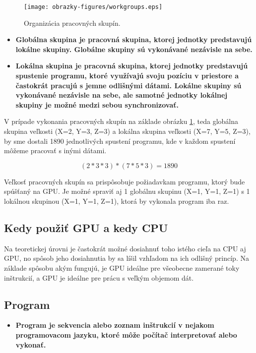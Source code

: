 \begin{figure}[H]
	\centering
	\texttt{[image: obrazky-figures/workgroups.eps]}
	\caption{Organizácia pracovných skupín.}
	\label{workgroups}
\end{figure}

\begin{itemize}
  \item{\bf Globálna skupina \rm je pracovná skupina, ktorej jednotky predstavujú lokálne skupiny. Globálne skupiny sú vykonávané nezávisle na sebe.}
  \item{\bf Lokálna skupina \rm je pracovná skupina, ktorej jednotky predstavujú spustenie programu, ktoré využívajú svoju pozíciu v priestore a častokrát pracujú s jemne odlišnými dátami. Lokálne skupiny sú vykonávané nezávisle na sebe, ale samotné jednotky lokálnej skupiny je možné medzi sebou synchronizovať.}
\end{itemize}

V prípade vykonania pracovných skupín na základe obrázku \ref{workgroups}, teda globálna skupina veľkosti (X=2, Y=3, Z=3) a lokálna skupina veľkosti (X=7, Y=5, Z=3), by sme dostali 1890 jednotlivých spustení programu, kde v každom spustení môžeme pracovať s inými dátami.

\begin{equation}
	(2*3*3) * (7*5*3) = 1890
	\label{eq:workgroupeq}
\end{equation}

Veľkosť pracovných skupín sa prispôsobuje požiadavkam programu, ktorý bude spúšťaný na GPU. Je možné spraviť aj 1 globálnu skupinu (X=1, Y=1, Z=1) s 1 lokálnou skupinou (X=1, Y=1, Z=1), ktorá by vykonala program iba raz.

\subsection*{Kedy použiť GPU a kedy CPU}
Na teoretickej úrovni je častokrát možné dosiahnuť toho istého cieľa na CPU aj GPU, no spôsob jeho dosiahnutia by sa líšil vzhľadom na ich odlišný princíp. Na základe spôsobu akým fungujú, je GPU ideálne pre všeobecne zamerané toky inštrukcií, a GPU je ideálne pre prácu s veľkým objemom dát. 

\subsection{Program}

\begin{itemize}
  \item{\bf Program \rm je sekvencia alebo zoznam inštrukcií v nejakom programovacom jazyku, ktoré môže počítač interpretovať alebo vykonať.}
\end{itemize}

